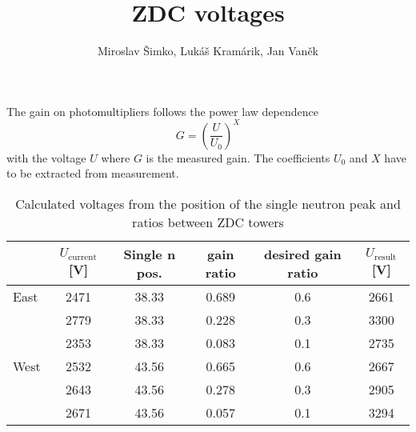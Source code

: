 \documentclass[a4paper,10pt]{article}
\title{ZDC voltages}
\author{Miroslav Šimko, Lukáš Kramárik, Jan Vaněk}
\date{}
\begin{document}
\maketitle

The gain on photomultipliers follows the power law dependence
\begin{equation}
G = \left(\frac{U}{U_0} \right)^X
\end{equation}
with the voltage $U$ where $G$ is the measured gain. The coefficients $U_0$ and $X$ have to be extracted from measurement.



\begin{table}[htb] 
\caption{Calculated voltages from the position of the single neutron peak and ratios 
between ZDC towers}
\label{uncorected}
\begin{center}
\begin{tabular}{lccccc}
 \toprule
 &$U_\text{current}$[V]&Single n pos.&gain ratio&desired gain ratio&$U_\text{result}$[V]\\
\midrule
 East&2471&38.33&0.689&0.6&2661\\
     &2779&38.33&0.228&0.3&3300\\
     &2353&38.33&0.083&0.1&2735\\
 \midrule
West&2532&43.56&0.665&0.6&2667\\
    &2643&43.56&0.278&0.3&2905\\
    &2671&43.56&0.057&0.1&3294\\
 \bottomrule
\end{tabular}
\end{center}
\end{table}
\end{document}
